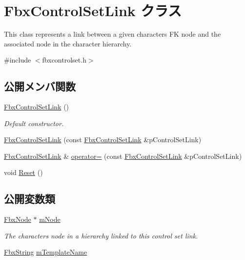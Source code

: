 \hypertarget{class_fbx_control_set_link}{}\section{Fbx\+Control\+Set\+Link クラス}
\label{class_fbx_control_set_link}


This class represents a link between a given character\textquotesingle{}s FK node and the associated node in the character hierarchy.  




{\ttfamily \#include $<$fbxcontrolset.\+h$>$}

\subsection*{公開メンバ関数}
\begin{DoxyCompactItemize}
\item 
\hyperlink{class_fbx_control_set_link_ae13e447eaf5a1f794b37d4a4f650377a}{Fbx\+Control\+Set\+Link} ()
\begin{DoxyCompactList}\small\item\em Default constructor. \end{DoxyCompactList}\item 
\hyperlink{class_fbx_control_set_link_a9ecef760859353c34c59d180431ccfe6}{Fbx\+Control\+Set\+Link} (const \hyperlink{class_fbx_control_set_link}{Fbx\+Control\+Set\+Link} \&p\+Control\+Set\+Link)
\item 
\hyperlink{class_fbx_control_set_link}{Fbx\+Control\+Set\+Link} \& \hyperlink{class_fbx_control_set_link_a32de9712bee72685b7447aa23b35bec7}{operator=} (const \hyperlink{class_fbx_control_set_link}{Fbx\+Control\+Set\+Link} \&p\+Control\+Set\+Link)
\item 
void \hyperlink{class_fbx_control_set_link_afedadf6bb18a836a2470636eda93ece9}{Reset} ()
\end{DoxyCompactItemize}
\subsection*{公開変数類}
\begin{DoxyCompactItemize}
\item 
\hyperlink{class_fbx_node}{Fbx\+Node} $\ast$ \hyperlink{class_fbx_control_set_link_a3996e9ed3db015da6c94b9f6c9b7c4f9}{m\+Node}
\begin{DoxyCompactList}\small\item\em The character\textquotesingle{}s node in a hierarchy linked to this control set link. \end{DoxyCompactList}\item 
\hyperlink{class_fbx_string}{Fbx\+String} \hyperlink{class_fbx_control_set_link_ac35309cd74ccd53e6b69273fafafbf7e}{m\+Template\+Name}
\end{DoxyCompactItemize}


